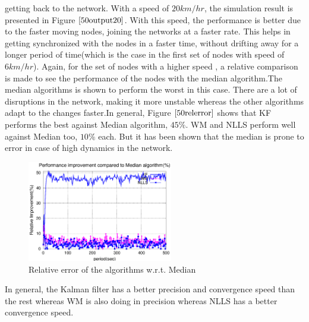 \documentclass[journal]{IEEEtran}
\begin{document}
getting back to the network. \newline With a speed of $20km/hr$, the
simulation result is presented in Figure $\ref{50output20}$. With
this speed, the performance is better due to the faster moving
nodes, joining the networks at a faster rate. This helps in getting
synchronized with the nodes in a faster time, without drifting away
for a longer period of time(which is the case in the first set of
nodes with speed of $6km/hr$). Again, for the set of nodes with a
higher speed , a relative comparison is made to see the performance
of the nodes with the median algorithm.\newline The median
algorithms is shown to perform the worst in this case. There are a
lot of disruptions in the network, making it more unstable whereas
the other algorithms adapt to the changes faster.\newline In
general, Figure $\ref{50relerror}$ shows that KF performs the best
against Median algorithm, $45\%$. WM and NLLS perform well against
Median too, $10\%$ each. But it has been shown that the median is
prone to error in case of high dynamics in the network.
\begin{figure}
\centering \includegraphics[width=2.5in]{50output-error}
\caption{Relative error of the algorithms w.r.t. Median}
\label{50relerror}
\end{figure}
In general, the Kalman filter has a better precision and convergence
speed than the rest whereas WM is also doing in precision whereas
NLLS has a better convergence speed.
\end{document}
